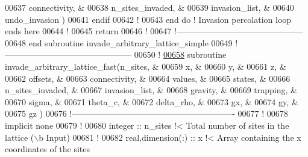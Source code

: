 \begin{DoxyCode}
00637                                             connectivity,      &
00638                                             n\_sites\_invaded,   &
00639                                             invasion\_list,     &
00640                                             undo\_invasion      )
00641        \textcolor{keyword}{endif}
00642        \textcolor{comment}{!}
00643     \textcolor{keyword}{end do} \textcolor{comment}{! Invasion percolation loop ends here}
00644     \textcolor{comment}{!}
00645     return
00646     \textcolor{comment}{!}
00647   \textcolor{comment}{!---------------------------------------------}
00648 \textcolor{keyword}{  end subroutine invade\_arbitrary\_lattice\_simple}
00649   \textcolor{comment}{!---------------------------------------------}
00650   \textcolor{comment}{!}
\hypertarget{module__invasion__percolation_8f90_source_l00658}{}\hyperlink{classmodule__invasion__percolation_a227847a38bc7518fdce187bbad590de0}{00658}   \textcolor{keyword}{subroutine }invade\_arbitrary\_lattice\_fast(n\_sites,         &
00659                                            x,               &
00660                                            y,               &
00661                                            z,               &
00662                                            offsets,         &
00663                                            connectivity,    &
00664                                            values,          &
00665                                            states,          &
00666                                            n\_sites\_invaded, &
00667                                            invasion\_list,   &
00668                                            gravity,         &
00669                                            trapping,        &
00670                                            sigma,           &
00671                                            theta\_c,         &
00672                                            delta\_rho,       &
00673                                            gx,              &
00674                                            gy,              &
00675                                            gz               )
00676   \textcolor{comment}{!----------------------------------------------------------}
00677     \textcolor{comment}{!}
00678     \textcolor{keyword}{implicit none}
00679     \textcolor{comment}{!}
00680     \textcolor{keywordtype}{integer} :: n\_sites \textcolor{comment}{!< Total number of sites in the lattice (\(\backslash\)b Input)}
00681     \textcolor{comment}{!}
00682     \textcolor{keywordtype}{real},\textcolor{keywordtype}{dimension(:)} :: x \textcolor{comment}{!< Array containing the x coordinates of the sites
}
\end{DoxyCode}
